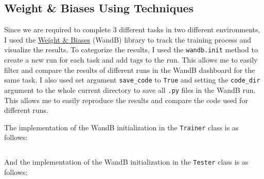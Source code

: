 \inputminted[firstline=20, lastline=82,highlightlines={53-60}]{python}{../dqn.py}

\subsection{Weight \& Biases Using Techniques}

Since we are required to complete 3 different tasks in two different environments, I used the \href{https://wandb.ai/site}{Weight \& Biases} (WandB) library to track the training process and visualize the results.
To categorize the results, I used the \texttt{wandb.init} method to create a new run for each task and add tags to the run.
This allows me to easily filter and compare the results of different runs in the WandB dashboard for the same task.
I also used set argument \texttt{save\_code} to \texttt{True} and setting the \texttt{code\_dir} argument to the whole current directory to save all \texttt{.py} files in the WandB run.
This allows me to easily reproduce the results and compare the code used for different runs.

The implementation of the WandB initialization in the \texttt{Trainer} class is as follows:
\inputminted[firstline=238,lastline=245,highlightlines={241-243,245}]{python}{../trainer.py}
And the implementation of the WandB initialization in the \texttt{Tester} class is as follows:
\inputminted[firstline=154,lastline=161,highlightlines={157-159,161}]{python}{../tester.py}
